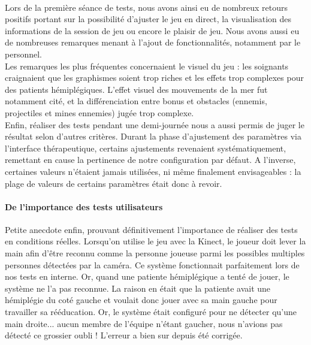 \paragraph{} 
Lors de la première séance de tests, nous avons ainsi eu de nombreux retours positifs portant sur la possibilité d'ajuster le jeu en direct, la visualisation des informations de la session de jeu ou encore le plaisir de jeu. Nous avons aussi eu de nombreuses remarques menant à l'ajout de fonctionnalités, notamment par le personnel.\\
Les remarques les plus fréquentes concernaient le visuel du jeu : les soignants craignaient que les graphismes soient trop riches et les effets trop complexes pour des patients hémiplégiques. L'effet visuel des mouvements de la mer fut notamment cité, et la différenciation entre bonus et obstacles (ennemis, projectiles et mines ennemies) jugée trop complexe.\\
Enfin, réaliser des tests pendant une demi-journée nous a aussi permis de juger le résultat selon d'autres critères. Durant la phase d'ajustement des paramètres via l'interface thérapeutique, certains ajustements revenaient systématiquement, remettant en cause la pertinence de notre configuration par défaut. A l'inverse, certaines valeurs n'étaient jamais utilisées, ni même finalement envisageables : la plage de valeurs de certains paramètres était donc à revoir.

\paragraph{De l'importance des tests utilisateurs\\}Petite anecdote enfin, prouvant définitivement l'importance de réaliser des tests en conditions réelles. Lorsqu'on utilise le jeu avec la Kinect, le joueur doit lever la main afin d'être reconnu comme la personne joueuse parmi les possibles multiples personnes détectées par la caméra. Ce système fonctionnait parfaitement lors de nos tests en interne. Or, quand une patiente hémiplégique a tenté de jouer, le système ne l'a pas reconnue. La raison en était que la patiente avait une hémiplégie du coté gauche et voulait donc jouer avec sa main gauche pour travailler sa rééducation. Or, le système était configuré pour ne détecter qu'une main droite... aucun membre de l'équipe n'étant gaucher, nous n'avions pas détecté ce grossier oubli ! L'erreur a bien sur depuis été corrigée.

